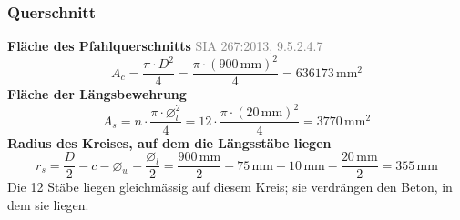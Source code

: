 \documentclass[11pt,a4paper]{article}
\newcommand{\normref}[1]{{\small\textcolor{gray}{#1}}}
\begin{document}
\subsubsection{Querschnitt}
\noindent\textbf{Fläche des Pfahlquerschnitts} \hfill \normref{SIA 267:2013, 9.5.2.4.7}
\begin{equation*}
A_c = \frac{\pi \cdot D^{2}}{4} = \frac{\pi \cdot \left(900\,\mathrm{mm}\right)^{2}}{4} = 636173\,\mathrm{mm}^{2}
\end{equation*}
\noindent\textbf{Fläche der Längsbewehrung}
\begin{equation*}
A_s = n \cdot \frac{\pi \cdot \varnothing_l^{2}}{4} = 12 \cdot \frac{\pi \cdot \left(20\,\mathrm{mm}\right)^{2}}{4} = 3770\,\mathrm{mm}^{2}
\end{equation*}
\noindent\textbf{Radius des Kreises, auf dem die Längsstäbe liegen}
\begin{equation*}
r_s = \frac{D}{2} - c - \varnothing_w - \frac{\varnothing_l}{2} = \frac{900\,\mathrm{mm}}{2} - 75\,\mathrm{mm} - 10\,\mathrm{mm} - \frac{20\,\mathrm{mm}}{2} = 355\,\mathrm{mm}
\end{equation*}
Die 12 Stäbe liegen gleichmässig auf diesem Kreis; sie verdrängen den Beton, in dem sie liegen.
\end{document}
